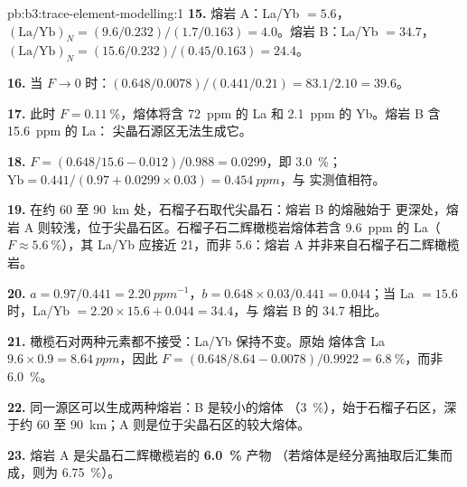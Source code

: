 \begin{solution}{pb:b3:trace-element-modelling:1}
\textbf{15.} 熔岩 A：La/Yb $= 5.6$，$(\mathrm{La}/\mathrm{Yb})_N =
(9.6/0.232)/(1.7/0.163) = 4.0$。熔岩 B：La/Yb $= 34.7$，$(\mathrm{La}/\mathrm{Yb})_N
= (15.6/0.232)/(0.45/0.163) = 24.4$。

\textbf{16.} 当 $F \to 0$ 时：$(0.648/0.0078)/(0.441/0.21) = 83.1/2.10 = 39.6$。

\textbf{17.} 此时 $F = \qty{0.11}{\percent}$，熔体将含
\qty{72}{ppm} 的 La 和 \qty{2.1}{ppm} 的 Yb。熔岩 B 含 \qty{15.6}{ppm} 的 La：
尖晶石源区无法生成它。

\textbf{18.} $F = (0.648/15.6 - 0.012)/0.988 = 0.0299$，即 \qty{3.0}{\percent}；
$\mathrm{Yb} = 0.441/(0.97 + 0.0299\times0.03) = \qty{0.454}{ppm}$，与
实测值相符。

\textbf{19.} 在约 60 至 \qty{90}{km} 处，石榴子石取代尖晶石：熔岩 B 的熔融始于
更深处，熔岩 A 则较浅，位于尖晶石区。石榴子石二辉橄榄岩熔体若含
\qty{9.6}{ppm} 的 La（$F \approx \qty{5.6}{\percent}$），其 La/Yb
应接近 21，而非 5.6：熔岩 A 并非来自石榴子石二辉橄榄岩。

\textbf{20.} $a = 0.97/0.441 = \qty{2.20}{ppm^{-1}}$，$b = 0.648\times0.03/0.441
= 0.044$；当 La $= 15.6$ 时，La/Yb $= 2.20\times15.6 + 0.044 = 34.4$，与
熔岩 B 的 34.7 相比。

\textbf{21.} 橄榄石对两种元素都不接受：La/Yb 保持不变。原始
熔体含 La $9.6\times0.9 = \qty{8.64}{ppm}$，因此 $F = (0.648/8.64 -
0.0078)/0.9922 = \qty{6.8}{\percent}$，而非 \qty{6.0}{\percent}。

\textbf{22.} 同一源区可以生成两种熔岩：B 是较小的熔体
（\qty{3}{\percent}），始于石榴子石区，深于约 60 至
\qty{90}{km}；A 则是位于尖晶石区的较大熔体。

\textbf{23.} 熔岩 A 是尖晶石二辉橄榄岩的 \textbf{\qty[text-series-to-math=true]{6.0}{\percent}} 产物
（若熔体是经分离抽取后汇集而成，则为
\qty{6.75}{\percent}）。
\end{solution}
